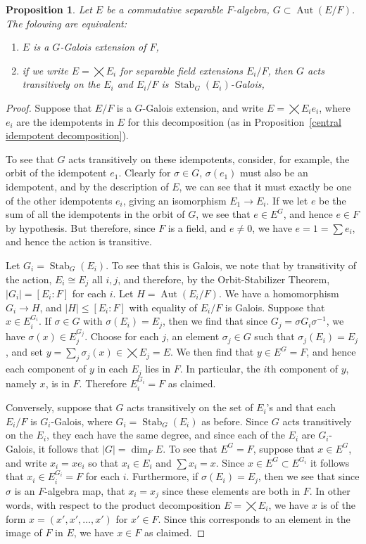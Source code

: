 \documentclass[12pt]{report}
\theoremstyle{plain}
\newtheorem{prop}[thm]{Proposition}
\newcommand{\oper}[1]{\operatorname{#1}}
\newcommand{\Aut}{\oper{Aut}}
\newcommand{\Stab}{\oper{Stab}}
\begin{document}
\begin{prop}
Let $E$ be a commutative separable $F$-algebra, $G \subset \Aut(E/F)$. The folowing are equivalent:
\begin{enumerate}[1. ]
\item $E$ is a $G$-Galois extension of $F$,
\item if we write $E = \bigtimes E_i$ for separable field extensions
$E_i/F$, then $G$ acts transitively on the $E_i$ and $E_i/F$ is
$\Stab_G(E_i)$-Galois,
\end{enumerate}
\end{prop}
\begin{proof}
Suppose that $E/F$ is a $G$-Galois extension, and write $E = \bigtimes E_i
e_i$, where $e_i$ are the idempotents in $E$ for this decomposition (as in 
Proposition~\ref{central idempotent decomposition}). 

To see that $G$ acts transitively on these idempotents, consider, for
example, the orbit of the idempotent $e_1$. Clearly for $\sigma \in G$,
$\sigma(e_1)$ must also be an idempotent, and by the description of $E$, we
can see that it must exactly be one of the other idempotents $e_i$, giving
an isomorphism $E_1 \to E_i$.  If we let $e$ be the sum of all the
idempotents in the orbit of $G$, we see that $e \in E^G$, and hence $e \in
F$ by hypothesis. But therefore, since $F$ is a field, and $e \neq 0$, we
have $e = 1 = \sum e_i$, and hence the action is transitive.

Let $G_i = \Stab_G(E_i)$. To see that this is Galois, we note that by
transitivity of the action, $E_i \cong E_j$ all $i, j$, and therefore, by the
Orbit-Stabilizer Theorem, $|G_i| = [E_i: F]$ for each $i$. Let $H =
\Aut(E_i/F)$. We have a homomorphism $G_i \to H$, and $|H| \leq [E_i : F]$
with equality of $E_i/F$ is Galois. Suppose that $x \in E_i^{G_i}$. If
$\sigma \in G$ with $\sigma(E_i) = E_j$, then we find that since $G_j =
\sigma G_i \sigma^{-1}$, we have $\sigma(x) \in E_j^{G_j}$. Choose for each
$j$, an element $\sigma_j \in G$ such that $\sigma_j(E_i) = E_j$, and
set $y = \sum_j \sigma_j(x) \in \bigtimes E_j = E$. We then find that $y
\in E^G = F$, and hence each component of $y$ in each $E_j$ lies in $F$. In
particular, the $i$th component of $y$, namely $x$, is in $F$. Therefore
$E_i^{G_i} = F$ as claimed.

Conversely, suppose that $G$ acts transitively on the set of $E_i$'s and
that each $E_i/F$ is $G_i$-Galois, where $G_i= \Stab_G(E_i)$ as before.
Since $G$ acts transitively on the $E_i$, they each have the same degree,
and since each of the $E_i$ are $G_i$-Galois, it follows that $|G| = \dim_F
E$. To see that $E^G = F$, suppose that $x \in E^G$, and write $x_i = x
e_i$ so that $x_i \in E_i$ and $\sum x_i = x$. Since $x \in E^G \subset
E^{G_i}$ it follows that $x_i \in E_i^{G_i} = F$ for each $i$. Furthermore,
if $\sigma(E_i) = E_j$, then we see that since $\sigma$ is an $F$-algebra
map, that $x_i = x_j$ since these elements are both in $F$. In other words,
with respect to the product decomposition $E = \bigtimes E_i$, we have $x$
is of the form $x = (x', x', \ldots, x')$ for $x' \in F$. Since this
corresponds to an element in the image of $F$ in $E$, we have $x \in F$ as
claimed.
\end{proof}
\end{document}
